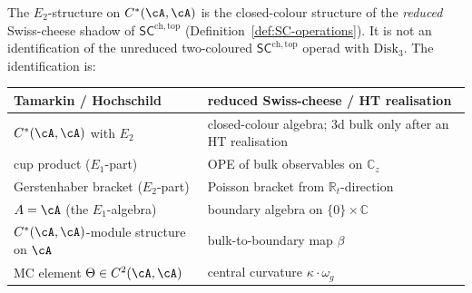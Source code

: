 \begin{proposition}
\label{prop:swiss-cheese-from-tamarkin}
The $E_2$-structure on $C^*(\cA,\cA)$ is the closed-colour structure of
the \emph{reduced} Swiss-cheese shadow of
$\mathsf{SC}^{\mathrm{ch,top}}$
\textup{(}Definition~\textup{\ref{def:SC-operations})}. It is not an
identification of the unreduced two-coloured
$\mathsf{SC}^{\mathrm{ch,top}}$ operad with $\mathrm{Disk}_3$. The
identification is:
\begin{center}
\renewcommand{\arraystretch}{1.15}
\begin{tabular}{ll}
\textbf{Tamarkin / Hochschild}
 & \textbf{reduced Swiss-cheese / HT realisation} \\
\hline
$C^*(\cA,\cA)$ with $E_2$
 & closed-colour algebra; 3d bulk only after an HT realisation \\
cup product ($E_1$-part)
 & OPE of bulk observables on $\mathbb C_z$ \\
Gerstenhaber bracket ($E_2$-part)
 & Poisson bracket from $\mathbb R_t$-direction \\
$A=\cA$ (the $E_1$-algebra)
 & boundary algebra on $\{0\}\times\mathbb C$ \\
$C^*(\cA,\cA)$-module structure on $\cA$
 & bulk-to-boundary map $\beta$ \\
MC element $\Theta\in C^2(\cA,\cA)$
 & central curvature $\kappa\cdot\omega_g$
\end{tabular}
\end{center}
\end{proposition}

